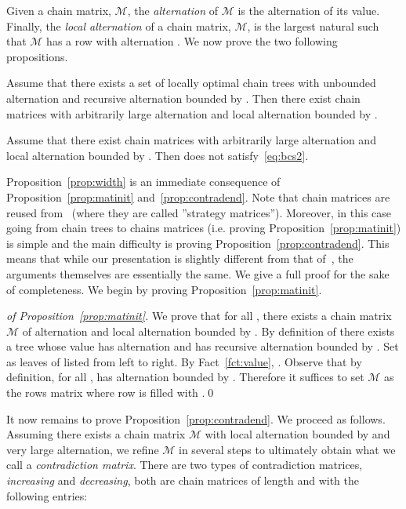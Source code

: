 \documentclass[envcountsame]{llncs}
\newcommand\mat{\ensuremath{\mathscr{M}}\xspace}
\newcommand\chain{chain\xspace}
\newcommand\chains{chains\xspace}
\begin{document}
Given a \chain matrix, \mat, the \emph{alternation} of \mat is the
alternation of its value. Finally, the \emph{local alternation} of a
\chain matrix, \mat, is the largest natural  such that \mat has a
row with alternation . We now prove the two following propositions.

\begin{proposition} \label{prop:matinit}
  Assume that there exists a set of locally optimal \chain trees  with unbounded alternation and recursive
  alternation bounded by . Then there exist \chain
  matrices with arbitrarily large alternation and local alternation
  bounded by .   
\end{proposition}

\begin{proposition} \label{prop:contradend}
  Assume that there exist \chain matrices with arbitrarily large alternation
  and local alternation bounded by . Then  does not
  satisfy~\eqref{eq:bcs2}. 
\end{proposition}

Proposition~\ref{prop:width} is an immediate consequence of
Proposition~\ref{prop:matinit} and~\ref{prop:contradend}. Note that
\chain matrices are reused from~\cite{bpopen} (where they are called
''strategy matrices''). Moreover, in this case going from \chain trees
to \chains matrices (i.e. proving Proposition~\ref{prop:matinit}) is
simple and the main difficulty is proving
Proposition~\ref{prop:contradend}. This means that while our presentation
is slightly different from that of~\cite{bpopen}, the arguments
themselves are essentially the same. We give a full proof for
the sake of completeness. We begin by proving Proposition~\ref{prop:matinit}.

\begin{proof}[of Proposition~\ref{prop:matinit}]
  We prove that for all , there exists a \chain matrix \mat
  of alternation  and local alternation bounded by . By definition
  of  there exists a tree  whose value has alternation
   and has recursive alternation bounded by . Set 
  as leaves of  listed from left to right. 
  By Fact~\ref{fct:value}, . Observe that by definition, for all ,  has
  alternation bounded by . Therefore it suffices to set \mat as the
   rows matrix where row  is filled with .\qed
\end{proof}


It now remains to prove Proposition~\ref{prop:contradend}. We proceed
as follows. Assuming there exists a \chain matrix \mat with local
alternation bounded by  and very large alternation, we refine \mat
in several steps to ultimately obtain what we call a
\emph{contradiction matrix}. There are two types of contradiction
matrices, \emph{increasing} and \emph{decreasing}, both are
\chain matrices of length  and with the following entries:
\end{document}
